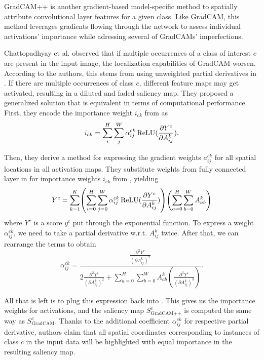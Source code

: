 GradCAM++ \cite{grad-cam-pp} is another gradient-based model-specific method to spatially attribute convolutional layer features for a given class.
Like GradCAM, this method leverages gradients flowing through the network to assess individual activations' importance while adressing several of GradCAMs' imperfections.

Chattopadhyay et al. \cite{grad-cam-pp} observed that if multiple occurrences of a class of interest $c$ are present in the input image, the localization capabilities of GradCAM worsen.
According to the authors, this stems from using unweighted partial derivatives in .
If there are multiple occurrences of class $c$, different feature maps may get activated, resulting in a diluted and faded saliency map.
They proposed a generalized solution that is equivalent in terms of computational performance.
First, they encode the importance weight $i_{ck}$ from  as
\begin{equation}\label{eq:grad-cam-pp-weights}
    i_{ck} = \sum_i^H \sum_j^W \alpha^{ck}_{ij} \operatorname{ReLU}(\frac{\partial Y^c}{\partial A^k_{ij}}).
\end{equation}

Then, they derive a method for expressing the gradient weights $a^{ck}_{ij}$ for all spatial locations in all activation maps.
They substitute weights from fully connected layer in  for importance weights $i_{ck}$ from , yielding
\begin{equation}\label{eq:grad-cam-pp-score}
    Y^c = \sum_{k=1}^K \left( \sum_{i=0}^H \sum_{j=0}^W \alpha^{ck}_{ij} \relu(\frac{\partial Y^c}{\partial A^k_{ij}}) \right) \left( \sum_{a=0}^H \sum_{b=0}^W A^{k}_{ab} \right)
\end{equation}
where $Y^c$ is a score $y^c$ put through the exponential function. To express a weight $\alpha^{ck}_{ij}$, we need to take a partial derivative w.r.t. $A^k_{ij}$ twice. After that, we can rearrange the terms to obtain
\begin{equation}
    \alpha^{ck}_{ij} = \frac{\frac{\partial^2 Y^c}{(\partial A^k_{ij})^2}}{2\frac{\partial^2 Y^c}{(\partial A^k_{ij})^2} + \sum_{a=0}^H \sum_{b=0}^W A^{k}_{ab} \left( \frac{\partial^3 Y^c}{(\partial A^k_{ij})^3} \right)}.
\end{equation}

All that is left is to plug this expression back into .
This gives us the importance weights for activations, and the saliency map $S^c_{\text{GradCAM++}}$ is computed the same way as $S^c_{\text{GradCAM}}$.
Thanks to the additional coefficient $\alpha^{ck}_{ij}$ for respective partial derivative, authors claim that all spatial coordinates corresponding to instances of class $c$ in the input data will be highlighted with equal importance in the resulting saliency map.

